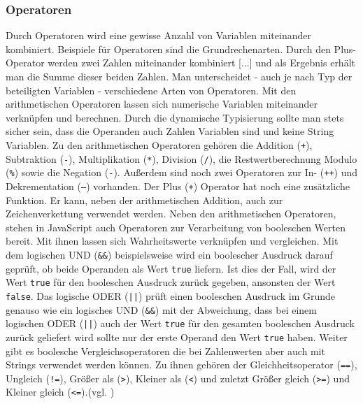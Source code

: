 \subsubsection{Operatoren} \glqq Durch Operatoren wird eine gewisse Anzahl von Variablen miteinander kombiniert. Beispiele für Operatoren sind die Grundrechenarten. Durch den Plus-Operator werden zwei Zahlen miteinander kombiniert [...] und als Ergebnis erhält man die Summe dieser beiden Zahlen. Man unterscheidet - auch je nach Typ der beteiligten Variablen - verschiedene Arten von Operatoren.\grqq{}\cite[S.69]{WenzJava2008} Mit den arithmetischen Operatoren lassen sich numerische Variablen miteinander verknüpfen und berechnen. Durch die dynamische Typisierung sollte man stets sicher sein, dass die Operanden auch Zahlen Variablen sind und keine String Variablen. Zu den arithmetischen Operatoren gehören die Addition (\texttt{+}), Subtraktion (\texttt{-}), Multiplikation (\texttt{*}), Division (\texttt{/}), die Restwertberechnung Modulo (\texttt{\%}) sowie die Negation (\texttt{-}). Außerdem sind noch zwei Operatoren zur In- (\texttt{++}) und Dekrementation (\texttt{--}) vorhanden. Der Plus (\texttt{+}) Operator hat noch eine zusätzliche Funktion. Er kann, neben der arithmetischen Addition, auch zur Zeichenverkettung verwendet werden. Neben den arithmetischen Operatoren, stehen in JavaScript auch Operatoren zur Verarbeitung von booleschen Werten bereit. Mit ihnen lassen sich Wahrheitswerte verknüpfen und vergleichen. Mit dem logischen UND (\texttt{\&\&}) beispielsweise wird ein boolescher Ausdruck darauf geprüft, ob beide Operanden als Wert \texttt{true} liefern. Ist dies der Fall, wird der Wert \texttt{true} für den booleschen Ausdruck zurück gegeben, ansonsten der Wert \texttt{false}. Das logische ODER (\texttt{||}) prüft einen booleschen Ausdruck im Grunde genauso wie ein logisches UND (\texttt{\&\&}) mit der Abweichung, dass bei einem logischen ODER (\texttt{||}) auch der Wert \texttt{true} für den gesamten booleschen Ausdruck zurück geliefert wird sollte nur der erste Operand den Wert \texttt{true} haben. Weiter gibt es boolesche Vergleichsoperatoren die bei Zahlenwerten aber auch mit Strings verwendet werden können. Zu ihnen gehören der Gleichheitsoperator (\texttt{==}), Ungleich (\texttt{!=}), Größer als (\texttt{\textgreater}), Kleiner als (\texttt{\textless}) und zuletzt Größer gleich (\texttt{\textgreater=}) und Kleiner gleich (\texttt{\textless=}).(vgl. \cite[S.71ff]{WenzJava2008})

